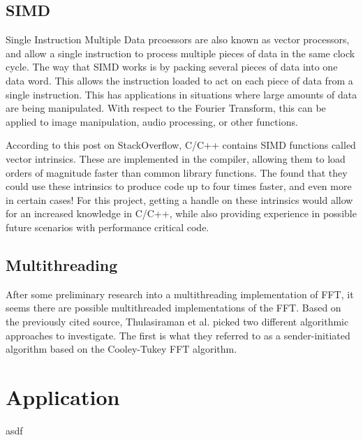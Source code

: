 \documentclass[12pt]{extarticle}
\begin{document}
\subsection*{SIMD}
    
    Single Instruction Multiple Data prcoessors are also known as vector processors, and allow a single instruction
    to process multiple pieces of data in the same clock cycle. The way that SIMD works is by packing several pieces of data
    into one data word. This allows the instruction loaded to act on each piece of data from a single instruction.
    This has applications in situations where large amounts of data are being manipulated. With respect to the Fourier Transform,
    this can be applied to image manipulation, audio processing, or other functions.

    According to this post\cite{Konstantin:2020} on StackOverflow, C/C++ contains SIMD functions called vector intrinsics.
    These are implemented in the compiler, allowing them to load orders of magnitude faster than common library functions. 
    The found that they could use these intrinsics to produce code up to four times faster, and even more in certain cases!
    For this project, getting a handle on these intrinsics would allow for an increased knowledge in C/C++, while also providing
    experience in possible future scenarios with performance critical code.

\subsection*{Multithreading}
    After some preliminary research into a multithreading implementation of FFT\cite{Thulasiraman:2021}, it seems there are
    possible multithreaded implementations of the FFT. Based on the previously cited source, Thulasiraman et al. picked two 
    different algorithmic approaches to investigate. The first is what they referred to as a sender-initiated algorithm based
    on the Cooley-Tukey FFT algorithm.

\section*{Application}
	asdf

\end{document}
